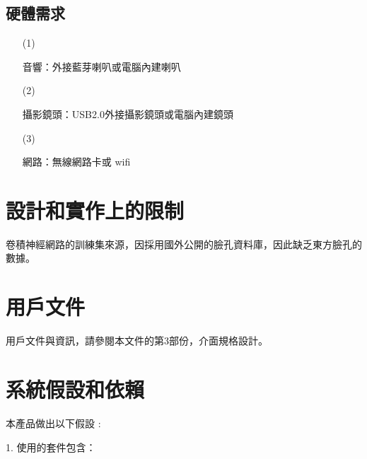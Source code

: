 \documentclass[12pt]{scrreprt}
\begin{document}
\subsection{硬體需求}
\begin{itemize}
\item[(1)]{\begin{bfseries}{音響：}外接藍芽喇叭或電腦內建喇叭\end{bfseries}}
\item[(2)]{\begin{bfseries}{攝影鏡頭：}USB2.0外接攝影鏡頭或電腦內建鏡頭\end{bfseries}}
\item[(3)]{\begin{bfseries}{網路：}無線網路卡或 wifi\end{bfseries}}
\end{itemize}

\section{設計和實作上的限制}
卷積神經網路的訓練集來源，因採用國外公開的臉孔資料庫，因此缺乏東方臉孔的數據。

\section{用戶文件}
用戶文件與資訊，請參閱本文件的第3部份，介面規格設計。
\section{系統假設和依賴}
本產品做出以下假設 :

1. 使用的套件包含：
\end{document}
